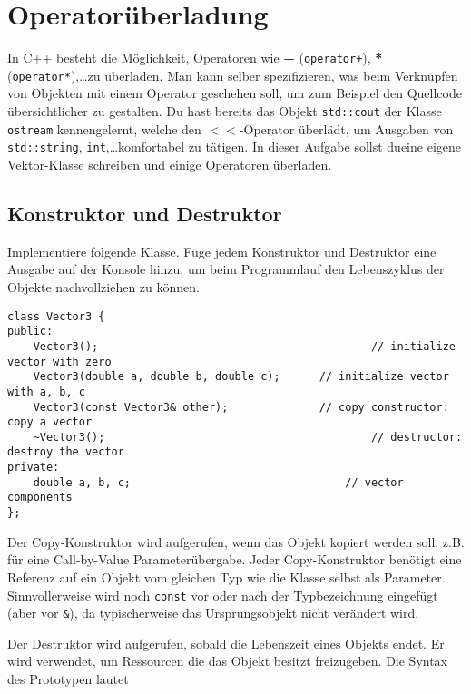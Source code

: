 \section{Operatorüberladung}
In C++ besteht die Möglichkeit, Operatoren wie \textbf{+} (\texttt{operator+}), \textbf{*} (\texttt{operator*}),\dots zu überladen.
Man kann selber spezifizieren, was beim Verknüpfen von Objekten mit einem Operator geschehen soll, um zum Beispiel den Quellcode übersichtlicher zu gestalten.
Du hast bereits das Objekt \texttt{std::cout} der Klasse \texttt{ostream} kennengelernt, welche den $<<$-Operator überlädt, um Ausgaben von \texttt{std::string}, \texttt{int},\dots komfortabel zu tätigen.
In dieser Aufgabe sollst dueine eigene Vektor-Klasse schreiben und einige Operatoren überladen.


\subsection{Konstruktor und Destruktor}
Implementiere folgende Klasse.
Füge jedem Konstruktor und Destruktor eine Ausgabe auf der Konsole hinzu, um beim Programmlauf den Lebenszyklus der Objekte nachvollziehen zu können.

\begin{lstlisting}
class Vector3 {
public:
	Vector3();											// initialize vector with zero
	Vector3(double a, double b, double c);		// initialize vector with a, b, c
	Vector3(const Vector3& other);				// copy constructor: copy a vector
	~Vector3();											// destructor: destroy the vector
private:
	double a, b, c;									// vector components
};
\end{lstlisting}

Der Copy-Konstruktor wird aufgerufen, wenn das Objekt kopiert werden soll, z.B. für eine Call-by-Value Parameterübergabe.
Jeder Copy-Konstruktor benötigt eine Referenz auf ein Objekt vom gleichen Typ wie die Klasse selbst als Parameter. 
Sinnvollerweise wird noch \texttt{const} vor oder nach der Typbezeichnung eingefügt (aber vor \texttt{\&}), da typischerweise das Ursprungsobjekt nicht verändert wird.

Der Destruktor wird aufgerufen, sobald die Lebenszeit eines Objekts endet. Er wird verwendet, um Ressourcen die das Objekt besitzt freizugeben.
Die Syntax des Prototypen lautet

